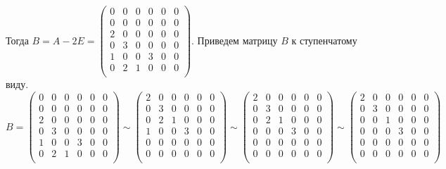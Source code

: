 \documentclass{article}
\begin{document}
  Тогда $B = A - 2 E = \begin{pmatrix}
  0 & 0 & 0 & 0 & 0 & 0 \\
  0 & 0 & 0 & 0 & 0 & 0 \\
  2 & 0 & 0 & 0 & 0 & 0 \\
  0 & 3 & 0 & 0 & 0 & 0 \\
  1 & 0 & 0 & 3 & 0 & 0 \\
  0 & 2 & 1 & 0 & 0 & 0 \\
  \end{pmatrix}$.
  Приведем матрицу $B$ к ступенчатому виду.
  \[
    B = \begin{pmatrix}
  0 & 0 & 0 & 0 & 0 & 0 \\
  0 & 0 & 0 & 0 & 0 & 0 \\
  2 & 0 & 0 & 0 & 0 & 0 \\
  0 & 3 & 0 & 0 & 0 & 0 \\
  1 & 0 & 0 & 3 & 0 & 0 \\
  0 & 2 & 1 & 0 & 0 & 0 \\
  \end{pmatrix}
  \sim
  \begin{pmatrix}
  2 & 0 & 0 & 0 & 0 & 0 \\
  0 & 3 & 0 & 0 & 0 & 0 \\
  0 & 2 & 1 & 0 & 0 & 0 \\
  1 & 0 & 0 & 3 & 0 & 0 \\
  0 & 0 & 0 & 0 & 0 & 0 \\
  0 & 0 & 0 & 0 & 0 & 0 \\
  \end{pmatrix}
  \sim
  \begin{pmatrix}
  2 & 0 & 0 & 0 & 0 & 0 \\
  0 & 3 & 0 & 0 & 0 & 0 \\
  0 & 2 & 1 & 0 & 0 & 0 \\
  0 & 0 & 0 & 3 & 0 & 0 \\
  0 & 0 & 0 & 0 & 0 & 0 \\
  0 & 0 & 0 & 0 & 0 & 0 \\
  \end{pmatrix}
  \sim
  \begin{pmatrix}
  2 & 0 & 0 & 0 & 0 & 0 \\
  0 & 3 & 0 & 0 & 0 & 0 \\
  0 & 0 & 1 & 0 & 0 & 0 \\
  0 & 0 & 0 & 3 & 0 & 0 \\
  0 & 0 & 0 & 0 & 0 & 0 \\
  0 & 0 & 0 & 0 & 0 & 0 \\
  \end{pmatrix}
  \]
\end{document}
